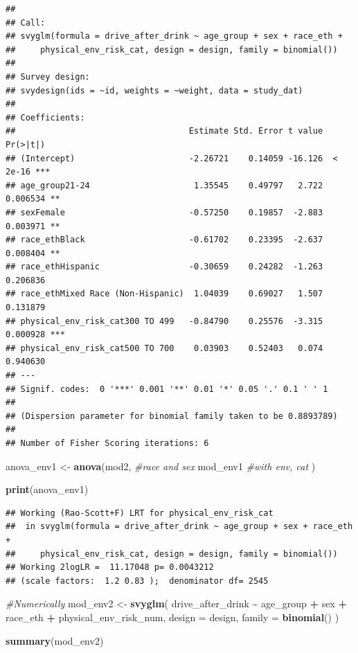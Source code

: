 \documentclass[
]{article}
\newenvironment{Shaded}{\begin{snugshade}}{\end{snugshade}}
\newcommand{\AttributeTok}[1]{\textcolor[rgb]{0.13,0.29,0.53}{#1}}
\newcommand{\CommentTok}[1]{\textcolor[rgb]{0.56,0.35,0.01}{\textit{#1}}}
\newcommand{\FunctionTok}[1]{\textcolor[rgb]{0.13,0.29,0.53}{\textbf{#1}}}
\newcommand{\NormalTok}[1]{#1}
\newcommand{\OtherTok}[1]{\textcolor[rgb]{0.56,0.35,0.01}{#1}}
\newcommand{\SpecialCharTok}[1]{\textcolor[rgb]{0.81,0.36,0.00}{\textbf{#1}}}
\begin{document}
\begin{verbatim}
## 
## Call:
## svyglm(formula = drive_after_drink ~ age_group + sex + race_eth + 
##     physical_env_risk_cat, design = design, family = binomial())
## 
## Survey design:
## svydesign(ids = ~id, weights = ~weight, data = study_dat)
## 
## Coefficients:
##                                   Estimate Std. Error t value Pr(>|t|)    
## (Intercept)                       -2.26721    0.14059 -16.126  < 2e-16 ***
## age_group21-24                     1.35545    0.49797   2.722 0.006534 ** 
## sexFemale                         -0.57250    0.19857  -2.883 0.003971 ** 
## race_ethBlack                     -0.61702    0.23395  -2.637 0.008404 ** 
## race_ethHispanic                  -0.30659    0.24282  -1.263 0.206836    
## race_ethMixed Race (Non-Hispanic)  1.04039    0.69027   1.507 0.131879    
## physical_env_risk_cat300 TO 499   -0.84790    0.25576  -3.315 0.000928 ***
## physical_env_risk_cat500 TO 700    0.03903    0.52403   0.074 0.940630    
## ---
## Signif. codes:  0 '***' 0.001 '**' 0.01 '*' 0.05 '.' 0.1 ' ' 1
## 
## (Dispersion parameter for binomial family taken to be 0.8893789)
## 
## Number of Fisher Scoring iterations: 6
\end{verbatim}

\begin{Shaded}
\begin{Highlighting}[]
\NormalTok{anova\_env1 }\OtherTok{\textless{}{-}} \FunctionTok{anova}\NormalTok{(mod2, }\CommentTok{\#race and sex }
\NormalTok{                      mod\_env1 }\CommentTok{\#with env, cat}
\NormalTok{                      ) }

\FunctionTok{print}\NormalTok{(anova\_env1) }
\end{Highlighting}
\end{Shaded}

\begin{verbatim}
## Working (Rao-Scott+F) LRT for physical_env_risk_cat
##  in svyglm(formula = drive_after_drink ~ age_group + sex + race_eth + 
##     physical_env_risk_cat, design = design, family = binomial())
## Working 2logLR =  11.17048 p= 0.0043212 
## (scale factors:  1.2 0.83 );  denominator df= 2545
\end{verbatim}

\begin{Shaded}
\begin{Highlighting}[]
\CommentTok{\#Numerically }
\NormalTok{mod\_env2 }\OtherTok{\textless{}{-}} \FunctionTok{svyglm}\NormalTok{(}
\NormalTok{  drive\_after\_drink }\SpecialCharTok{\textasciitilde{}}\NormalTok{ age\_group }\SpecialCharTok{+}\NormalTok{ sex }\SpecialCharTok{+}\NormalTok{ race\_eth }\SpecialCharTok{+}
\NormalTok{  physical\_env\_risk\_num,}
  \AttributeTok{design =}\NormalTok{ design,}
  \AttributeTok{family =} \FunctionTok{binomial}\NormalTok{()}
\NormalTok{)  }

\FunctionTok{summary}\NormalTok{(mod\_env2)}
\end{Highlighting}
\end{Shaded}
\end{document}
